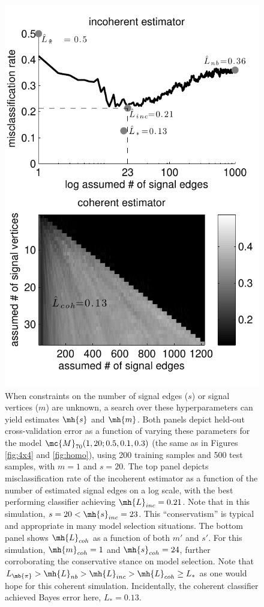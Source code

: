 \documentclass[10pt,journal,cspaper,compsoc]{IEEEtran}
\begin{document}
\begin{figure}[htbp]
	\centering
		\includegraphics[width=0.8\linewidth]{../figs/coherent_image_V70_s20_p10_q30_nTr200_nTe500.pdf}
	\caption{When constraints on the number of signal edges ($s$) or signal vertices ($m$) are unknown, a search over these hyperparameters can yield estimates $\mh{s}$ and $\mh{m}$.  Both panels depict held-out cross-validation error as a function of varying these parameters for the model 
	$\mc{M}_{70}(1,20;0.5,0.1,0.3)$
	(the same as in Figures \ref{fig:4x4} and \ref{fig:homo}), using 200 training samples and 500 test samples, with $m=1$ and $s=20$.  The top panel depicts misclassification rate of the incoherent estimator as a function of the number of estimated signal edges on a log scale, with the best performing classifier achieving $\mh{L}_{inc}=0.21$. Note that in this simulation,  $s=20< \mh{s}_{inc}=23$.  This ``conservatism'' is typical and appropriate in many model selection situations.  The bottom panel shows $\mh{L}_{coh}$ as a function of both $m'$ and $s'$.  For this simulation, $\mh{m}_{coh}=1$ and $\mh{s}_{coh}=24$, further corroborating the conservative stance on model selection. Note that $L_{\mb{\pi}} > \mh{L}_{nb} > \mh{L}_{inc} > \mh{L}_{coh} \geq L_*$ as one would hope for this coherent simulation.  Incidentally, the coherent classifier achieved Bayes error here, $L_*=0.13$.}
	\label{fig:coherent}
\end{figure}
\end{document}
